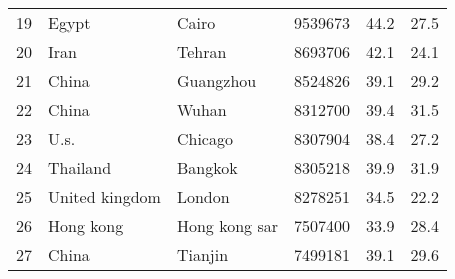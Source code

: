 \begin{center}
\begin{longtable}{clllcc}
        19                                       & Egypt                                & Cairo                             & 9539673                                 & 44.2                                  & 27.5                                  \\
        20                                       & Iran                                 & Tehran                            & 8693706                                 & 42.1                                  & 24.1                                  \\
        21                                       & China                                & Guangzhou                         & 8524826                                 & 39.1                                  & 29.2                                  \\
        22                                       & China                                & Wuhan                             & 8312700                                 & 39.4                                  & 31.5                                  \\
        23                                       & U.s.                                 & Chicago                           & 8307904                                 & 38.4                                  & 27.2                                  \\
        24                                       & Thailand                             & Bangkok                           & 8305218                                 & 39.9                                  & 31.9                                  \\
        25                                       & United kingdom                       & London                            & 8278251                                 & 34.5                                  & 22.2                                  \\
        26                                       & Hong kong                            & Hong kong sar                     & 7507400                                 & 33.9                                  & 28.4                                  \\
        27                                       & China                                & Tianjin                           & 7499181                                 & 39.1                                  & 29.6                                  \\

\end{longtable}
\end{center}

